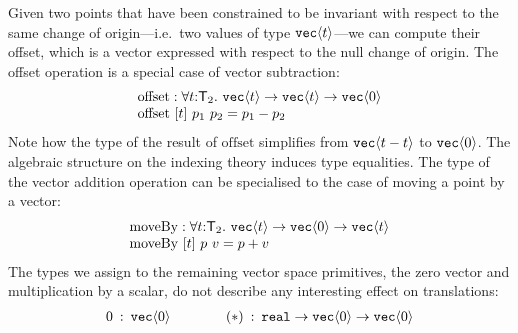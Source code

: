 Given two points that have been constrained to be invariant with
respect to the same change of origin---i.e.~two values of type
$\texttt{vec}\langle t \rangle$---we can compute their offset, which is a vector
expressed with respect to the null change of origin. The offset
operation is a special case of vector subtraction:
\begin{displaymath}
  \begin{array}{l}
    \mathrm{offset} : \forall t \mathord:\mathsf{T}_2.\ \texttt{vec}\langle t \rangle \to \texttt{vec}\langle t \rangle \to \texttt{vec}\langle 0 \rangle \\
    \mathrm{offset}\ [t]\ p_1\ p_2 = p_1 - p_2
  \end{array}
\end{displaymath}
Note how the type of the result of $\mathrm{offset}$ simplifies from
$\texttt{vec}\langle t-t \rangle$ to $\texttt{vec}\langle 0 \rangle$. The algebraic structure on
the indexing theory induces type equalities.  The type of the vector
addition operation can be specialised to the case of moving a point by
a vector:
\begin{displaymath}
  \begin{array}{l}
    \mathrm{moveBy} : \forall t \mathord:\mathsf{T}_2.\ \texttt{vec}\langle t \rangle \to \texttt{vec}\langle 0 \rangle \to \texttt{vec}\langle t \rangle \\
    \mathrm{moveBy}\ [t]\ p\ v = p + v
  \end{array}
\end{displaymath}
The types we assign to the remaining vector space primitives, the zero
vector and multiplication by a scalar, do not describe any interesting
effect on translations:
\begin{displaymath}
  \begin{array}{l@{\hspace{0.5em}:\hspace{0.5em}}l@{\hspace{4em}}l@{\hspace{0.5em}:\hspace{0.5em}}l}
    \mathrm{0} & \tyPrim{vec}{0}&
    (*) & \tyPrimNm{real} \to \tyPrim{vec}{0} \to \tyPrim{vec}{0}
  \end{array}
\end{displaymath}



